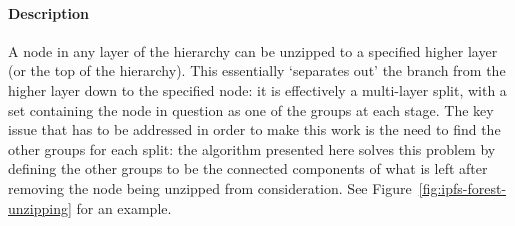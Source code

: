 \paragraph{Description}

A node in any layer of the hierarchy can be unzipped to a specified higher layer (or the top of the hierarchy). This essentially `separates out' the branch from the higher layer down to the specified node: it is effectively a multi-layer split, with a set containing the node in question as one of the groups at each stage. The key issue that has to be addressed in order to make this work is the need to find the other groups for each split: the algorithm presented here solves this problem by defining the other groups to be the connected components of what is left after removing the node being unzipped from consideration. See Figure~\ref{fig:ipfs-forest-unzipping} for an example.

